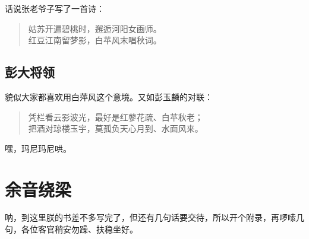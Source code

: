 \documentclass[]{ctexbook}
\begin{document}
话说张老爷子写了一首诗：

\begin{quote}
姑苏开遍碧桃时，邂逅河阳女画师。\\
红豆江南留梦影，白苹风末唱秋词。
\end{quote}

\section{彭大将领}

貌似大家都喜欢用白萍风这个意境。又如彭玉麟的对联：

\begin{quote}
凭栏看云影波光，最好是红蓼花疏、白苹秋老；\\
把酒对琼楼玉宇，莫孤负天心月到、水面风来。
\end{quote}

嘿，玛尼玛尼哄。

\cleardoublepage 

\appendix {}


\chapter{余音绕梁}\label{sound}

呐，到这里朕的书差不多写完了，但还有几句话要交待，所以开个附录，再啰嗦几句，各位客官稍安勿躁、扶稳坐好。



\backmatter
\printindex
\end{document}
